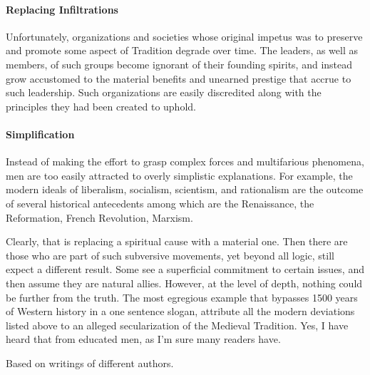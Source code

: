 \paragraph{Replacing Infiltrations}


Unfortunately, organizations and societies whose original impetus was to preserve and promote some aspect of Tradition degrade over time. The leaders, as well as members, of such groups become ignorant of their founding spirits, and instead grow accustomed to the material benefits and unearned prestige that accrue to such leadership. Such organizations are easily discredited along with the principles they had been created to uphold.

\paragraph{Simplification}


Instead of making the effort to grasp complex forces and multifarious phenomena, men are too easily attracted to overly simplistic explanations. For example, the modern ideals of liberalism, socialism, scientism, and rationalism are the outcome of several historical antecedents among which are the Renaissance, the Reformation, French Revolution, Marxism.

Clearly, that is replacing a spiritual cause with a material one. Then there are those who are part of such subversive movements, yet beyond all logic, still expect a different result. Some see a superficial commitment to certain issues, and then assume they are natural allies. However, at the level of depth, nothing could be further from the truth. The most egregious example that bypasses 1500 years of Western history in a one sentence slogan, attribute all the modern deviations listed above to an alleged secularization of the Medieval Tradition. Yes, I have heard that from educated men, as I'm sure many readers have.

Based on writings of different authors.



